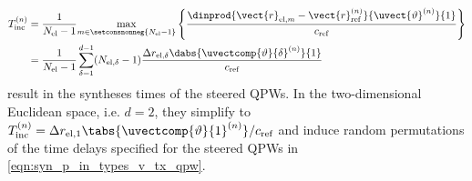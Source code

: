\begin{subequations}
\begin{equation}
\begin{split}
  T_{\text{inc}}^{(n)}
  &=
  \frac{ 1 }{ N_{\text{el}} - 1 }
  \underset{ m \in \setconsnonneg{ N_{\text{el}} - 1 } }{ \max }
  \left\{
    \frac{
      \dinprod{ \vect{r}_{\text{el}, m} - \vect{r}_{\text{ref}}^{(n)} }{ \uvect{\vartheta}^{(n)} }{1}
    }{
      c_{\text{ref}}
    }
  \right\}\\
  &=
  \frac{ 1 }{ N_{\text{el}} - 1 }
  \sum_{ \delta = 1 }^{ d - 1 }
    ( N_{\text{el}, \delta} - 1 )
    \frac{
      \Delta r_{\text{el}, \delta}
      \dabs{ \uvectcomp{ \vartheta }{ \delta }^{(n)} }{1}
    }{
      c_{\text{ref}}
    }
\end{split}
\label{eqn:syn_p_in_types_v_tx_rnd_del_interval}
\end{equation}
\end{subequations}
result in
the syntheses times of
the steered \acp{QPW}.
In
the two-dimensional Euclidean space, i.e. $d = 2$,
they simplify to
$T_{\text{inc}}^{(n)} = \Delta r_{\text{el}, 1} \tabs{ \uvectcomp{ \vartheta }{ 1 }^{(n)} } / c_{\text{ref}}$ and induce
random permutations of
the time delays specified for
the steered \acp{QPW} in
\eqref{eqn:syn_p_in_types_v_tx_qpw}.
